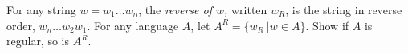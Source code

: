 \documentclass[12pt]{article}
\begin{document}
For any string $w = w_1\ldots w_n$, the {\em reverse of $w$,\/} written $w_{R}$, is the string in reverse order, $w_n \ldots w_2w_1$. For any language $A$, let $A^{R} = \{ w_{R} \
| w \in A \}$. Show if $A$ is regular, so is $A^{R}$.






\end{document}
